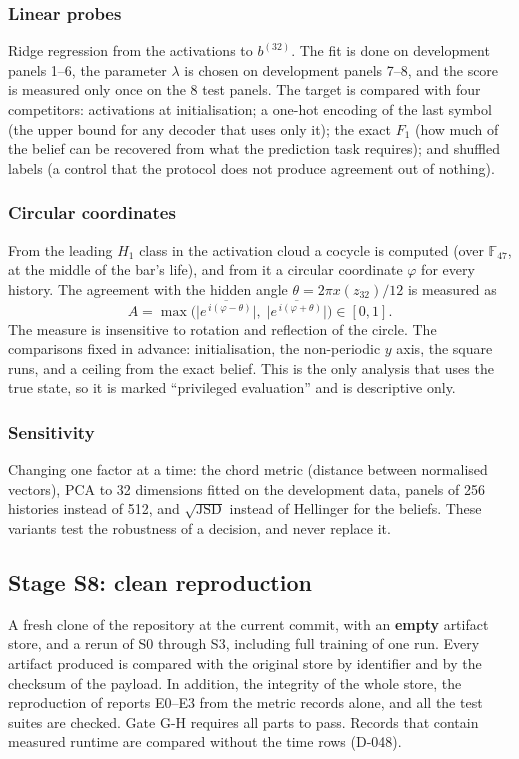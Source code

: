 \documentclass[12pt,a4paper]{article}
\newcommand{\en}[1]{\foreignlanguage{english}{#1}}   %
\newcommand{\bel}[1]{b^{(#1)}}
\begin{document}
\subsubsection{Linear \en{probes}}
\en{Ridge} regression from the activations to $\bel{32}$. The fit is done on development panels 1–6, the parameter $\lambda$ is chosen on development panels 7–8, and the score is measured only once on the 8 test panels. The target is compared with four competitors: activations at initialisation; a \en{one-hot} encoding of the last symbol (the upper bound for any decoder that uses only it); the exact $F_1$ (how much of the belief can be recovered from what the prediction task requires); and shuffled labels (a control that the protocol does not produce agreement out of nothing).

\subsubsection{Circular coordinates}
From the leading $H_1$ class in the activation cloud a cocycle is computed (over $\mathbb{F}_{47}$, at the middle of the bar's life), and from it a circular coordinate $\varphi$ for every history. The agreement with the hidden angle $\theta=2\pi x(z_{32})/12$ is measured as
\begin{equation}
A=\max\Big(\big|\overline{e^{\,i(\varphi-\theta)}}\big|,\;\big|\overline{e^{\,i(\varphi+\theta)}}\big|\Big)\in[0,1].
\end{equation}
The measure is insensitive to rotation and reflection of the circle. The comparisons fixed in advance: initialisation, the non-periodic $y$ axis, the square runs, and a ceiling from the exact belief. This is the only analysis that uses the true state, so it is marked ``privileged evaluation'' and is descriptive only.

\subsubsection{Sensitivity}
Changing one factor at a time: the \en{chord} metric (distance between normalised vectors), \en{PCA} to 32 dimensions fitted on the development data, panels of 256 histories instead of 512, and $\sqrt{\mathrm{JSD}}$ instead of \en{Hellinger} for the beliefs. These variants test the robustness of a decision, and never replace it.

\subsection{Stage S8: clean reproduction}
A fresh clone of the repository at the current \en{commit}, with an \textbf{empty} artifact store, and a rerun of S0 through S3, including full training of one run. Every artifact produced is compared with the original store by identifier and by the \en{checksum} of the payload. In addition, the integrity of the whole store, the reproduction of reports \en{E0--E3} from the metric records alone, and all the test suites are checked. Gate \en{G-H} requires all parts to pass. Records that contain measured runtime are compared without the time rows (\en{D-048}).
\end{document}

